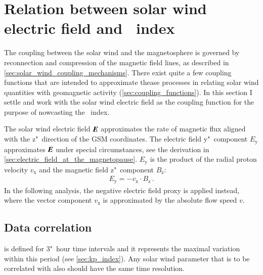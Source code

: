 \section{Relation between solar wind electric field and \Kp~index}
\label{sec:relation_between_sw_efield_and_kp}
The coupling between the solar wind and the magnetosphere is governed by reconnection and compression of the magnetic field lines, as described in \autoref{sec:solar_wind_coupling_mechanisms}. There exist quite a few coupling functions that are intended to approximate thease processes in relating solar wind quantities with geomagnetic activity (\autoref{sec:coupling_functions}). In this section I settle and work with the solar wind electric field as the coupling function for the purpose of nowcasting the \Kp~index.

The solar wind electric field $\boldsymbol{E}$ approximates the rate of magnetic flux aligned with the z"~direction of the GSM coordinates. The electric field y"~component $E_\text{y}$ approximates $\boldsymbol{E}$ under special circumstances, see the derivation in \autoref{sec:electric_field_at_the_magnetopause}. $E_\text{y}$ is the product of the radial proton velocity $v_\text{x}$ and the magnetic field z"~component $B_\text{z}$:
\begin{align}
	E_\text{y} = -v_\text{x} \cdot B_\text{z}\,.
\end{align}
In the following analysis, the negative electric field proxy \vBz{} is applied instead, where the vector component $v_\text{x}$ is approximated by the absolute flow speed $v$.




\subsection{Data correlation}
\label{sec:data_correlation}
\Kp{} is defined for 3"~hour time intervals and it represents the maximal variation within this period (see \autoref{sec:kp_index}). Any solar wind parameter that is to be correlated with \Kp{} also should have the same time resolution.

